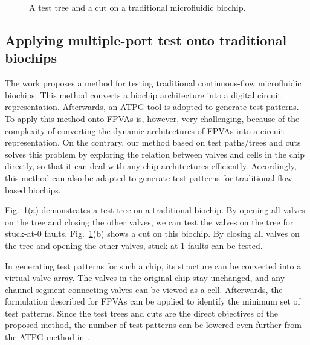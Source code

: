 \begin{figure}
{\figurefontsize
\centering

\caption{A test tree and a cut on a traditional microfluidic biochip.}
\label{fig:trees_cuts_traditional}
}
\end{figure}




\subsection{Applying multiple-port test onto traditional biochips}
\label{sec:adapt_traditional}

The work \cite{HuYHC14} proposes a method for testing traditional
continuous-flow microfluidic biochips. This method converts a biochip
architecture into a digital circuit representation.
Afterwards, an ATPG tool is adopted to generate test patterns. 
To apply this method onto FPVAs is, however, very challenging, because of the 
complexity of converting the dynamic architectures of FPVAs into a circuit
representation. 
On the contrary, our method based on test paths/trees and cuts
solves this problem by exploring the relation between valves and cells in
the chip directly, so that it can deal with any 
chip architectures efficiently. Accordingly, this method can also be adapted to
generate test patterns for traditional flow-based biochips.

Fig.~\ref{fig:trees_cuts_traditional}(a) demonstrates a test tree on a
traditional biochip. By opening all valves on the tree and closing the
other valves, we can test the valves on the tree for stuck-at-0 faults.
Fig.~\ref{fig:trees_cuts_traditional}(b) shows a cut on this
biochip. By closing all valves on the tree and opening the other valves, 
stuck-at-1 faults can be tested.

In generating test patterns for such a chip, its structure can be converted into
a virtual valve array. The valves in the original chip stay unchanged, and 
any channel segment connecting valves 
can be viewed as a cell. Afterwards, the formulation described for FPVAs can
be applied to identify the minimum set of test patterns. Since the test trees
and cuts are the direct objectives of the proposed method, the number of test
patterns can be lowered even further from the ATPG method in \cite{HuYHC14}.

